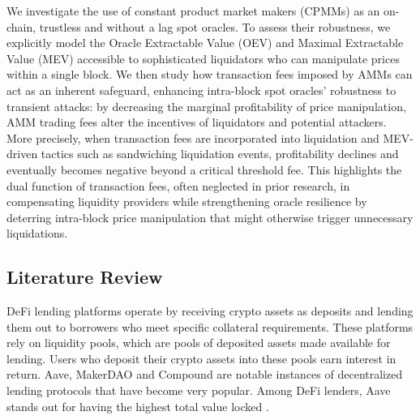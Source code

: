 \documentclass[11pt]{article} %
\begin{document}
We investigate the use of constant product market makers (CPMMs) as an on-chain, trustless and without a lag spot oracles. To assess their robustness, we explicitly model the Oracle Extractable Value (OEV) and Maximal Extractable Value (MEV) accessible to sophisticated liquidators who can manipulate prices within a single block. We then study how transaction fees imposed by AMMs can act as an inherent safeguard, enhancing intra-block spot oracles’ robustness to transient attacks: by decreasing the marginal profitability of price manipulation, AMM trading fees alter the incentives of liquidators and potential attackers. More precisely, when transaction fees are incorporated into liquidation and MEV-driven tactics such as sandwiching liquidation events, profitability declines and eventually becomes negative beyond a critical threshold fee. This highlights the dual function of transaction fees, often neglected in prior research, in compensating liquidity providers while strengthening oracle resilience by deterring intra-block price manipulation that might otherwise trigger unnecessary liquidations.
\subsection{Literature Review}\label{sec:intro-litrev}
DeFi lending platforms operate by receiving crypto assets as deposits and lending them out to borrowers who meet specific collateral requirements. These platforms rely on liquidity pools, which are pools of deposited assets made available for lending. Users who deposit their crypto assets into these pools earn interest in return. Aave, MakerDAO and Compound  are notable instances of decentralized lending protocols that have become very popular. Among DeFi lenders, Aave stands out for having the highest total value locked \citep{iftikhar25}.
\end{document}
